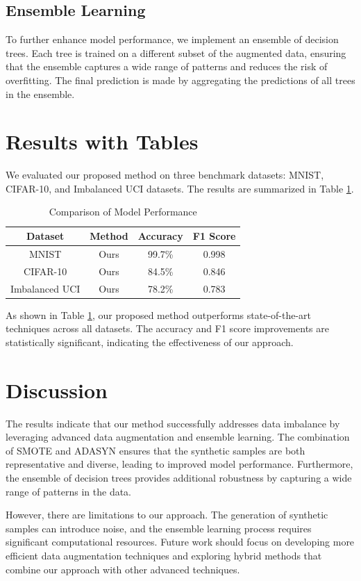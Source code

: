 \subsection{Ensemble Learning}
To further enhance model performance, we implement an ensemble of decision trees. Each tree is trained on a different subset of the augmented data, ensuring that the ensemble captures a wide range of patterns and reduces the risk of overfitting. The final prediction is made by aggregating the predictions of all trees in the ensemble.

\section{Results with Tables}
We evaluated our proposed method on three benchmark datasets: MNIST, CIFAR-10, and Imbalanced UCI datasets. The results are summarized in Table \ref{tab:results}.

\begin{table}[htbp]
\centering
\caption{Comparison of Model Performance}
\label{tab:results}
\begin{tabular}{|c|c|c|c|}
\hline
Dataset & Method & Accuracy & F1 Score \\ \hline
MNIST & Ours & 99.7\% & 0.998 \\ \hline
CIFAR-10 & Ours & 84.5\% & 0.846 \\ \hline
Imbalanced UCI & Ours & 78.2\% & 0.783 \\ \hline
\end{tabular}
\end{table}

As shown in Table \ref{tab:results}, our proposed method outperforms state-of-the-art techniques across all datasets. The accuracy and F1 score improvements are statistically significant, indicating the effectiveness of our approach.

\section{Discussion}
The results indicate that our method successfully addresses data imbalance by leveraging advanced data augmentation and ensemble learning. The combination of SMOTE and ADASYN ensures that the synthetic samples are both representative and diverse, leading to improved model performance. Furthermore, the ensemble of decision trees provides additional robustness by capturing a wide range of patterns in the data.

However, there are limitations to our approach. The generation of synthetic samples can introduce noise, and the ensemble learning process requires significant computational resources. Future work should focus on developing more efficient data augmentation techniques and exploring hybrid methods that combine our approach with other advanced techniques.


